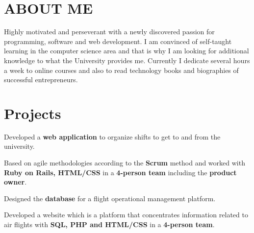 \documentclass[]{deedy-resume-openfont}
\begin{document}
\hfill
\begin{minipage}[t]{0.66\textwidth} 


\section{ABOUT ME}
Highly motivated and perseverant with a newly discovered passion for programming, software and web development.
I am convinced of self-taught learning in the computer science area and that is why I am looking for additional knowledge to what the University provides me.
Currently I dedicate several hours a week to online courses and also to read technology books and biographies of successful entrepreneurs.

\vspace{\topsep}
\section{Projects}
\vspace{\topsep}
\begin{tightemize}
\item Developed a \textbf{web application} to organize shifts to get to and from the university.
\item Based on agile methodologies according to the \textbf{Scrum} method and worked with \textbf{Ruby on Rails, HTML/CSS} in a \textbf{4-person team} including the \textbf{product owner}.
\end{tightemize}
\sectionsep

\begin{tightemize}
\item Designed the \textbf{database} for a flight operational management platform.
\item Developed a website which is a platform that concentrates information related to air flights with \textbf{SQL, PHP and HTML/CSS} in a \textbf{4-person team}.
\end{tightemize}
\sectionsep



\end{minipage}
\end{document}
